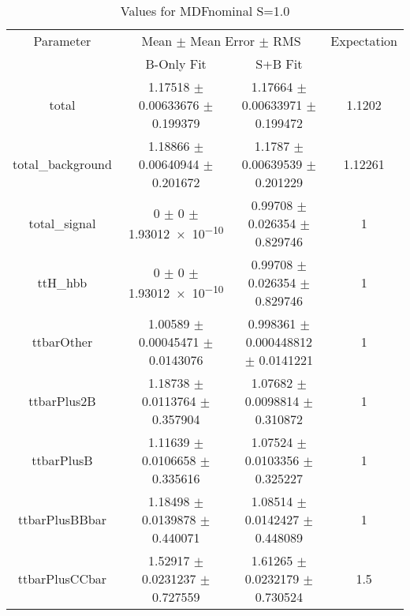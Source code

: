 \begin{table}
\centering
\caption{Values for MDFnominal S=1.0}
\begin{tabular}{cccc}
\toprule
Parameter & \multicolumn{2}{c}{Mean $\pm$ Mean Error $\pm$ RMS} & Expectation\\
 & B-Only Fit & S+B Fit & \\
\midrule
total & \num{1.17518} $\pm$ \num{0.00633676} $\pm$ \num{0.199379} & \num{1.17664} $\pm$ \num{0.00633971} $\pm$ \num{0.199472} & \num{1.1202}\\
total\_background & \num{1.18866} $\pm$ \num{0.00640944} $\pm$ \num{0.201672} & \num{1.1787} $\pm$ \num{0.00639539} $\pm$ \num{0.201229} & \num{1.12261}\\
total\_signal & \num{0} $\pm$ \num{0} $\pm$ \num{1.93012e-10} & \num{0.99708} $\pm$ \num{0.026354} $\pm$ \num{0.829746} & \num{1}\\
ttH\_hbb & \num{0} $\pm$ \num{0} $\pm$ \num{1.93012e-10} & \num{0.99708} $\pm$ \num{0.026354} $\pm$ \num{0.829746} & \num{1}\\
ttbarOther & \num{1.00589} $\pm$ \num{0.00045471} $\pm$ \num{0.0143076} & \num{0.998361} $\pm$ \num{0.000448812} $\pm$ \num{0.0141221} & \num{1}\\
ttbarPlus2B & \num{1.18738} $\pm$ \num{0.0113764} $\pm$ \num{0.357904} & \num{1.07682} $\pm$ \num{0.0098814} $\pm$ \num{0.310872} & \num{1}\\
ttbarPlusB & \num{1.11639} $\pm$ \num{0.0106658} $\pm$ \num{0.335616} & \num{1.07524} $\pm$ \num{0.0103356} $\pm$ \num{0.325227} & \num{1}\\
ttbarPlusBBbar & \num{1.18498} $\pm$ \num{0.0139878} $\pm$ \num{0.440071} & \num{1.08514} $\pm$ \num{0.0142427} $\pm$ \num{0.448089} & \num{1}\\
ttbarPlusCCbar & \num{1.52917} $\pm$ \num{0.0231237} $\pm$ \num{0.727559} & \num{1.61265} $\pm$ \num{0.0232179} $\pm$ \num{0.730524} & \num{1.5}\\
\bottomrule
\end{tabular}
\end{table}